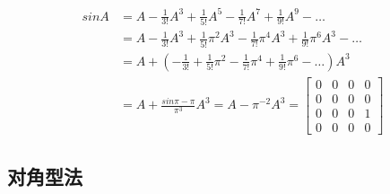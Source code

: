 \begin{solution}
\begin{enumerate}
\begin{align*}
                            sinA &= A - \frac{1}{3!}A^3 + \frac{1}{5!}A^5 - \frac{1}{7!}A^7 + \frac{1}{9!}A^9 - \dots \\ &= A - \frac{1}{3!}A^3 + \frac{1}{5!}\pi^2A^3 - \frac{1}{7!}\pi^4A^3 + \frac{1}{9!}\pi^6A^3 - \dots \\ &= A + (-\frac{1}{3!} + \frac{1}{5!}\pi^2 - \frac{1}{7!}\pi^4 + \frac{1}{9!}\pi^6 - \dots)A^3 \\ &= A + \frac{sin\pi-\pi}{\pi^3}A^3 = A - \pi^{-2}A^3 = \begin{bmatrix}
                                0 & 0 & 0 & 0 \\ 0 & 0 & 0 & 0 \\ 0 & 0 & 0 & 1 \\ 0 & 0 & 0 & 0
                            \end{bmatrix}
                        \end{align*}
                \end{enumerate}
            \end{solution}

    \subsection{对角型法}
